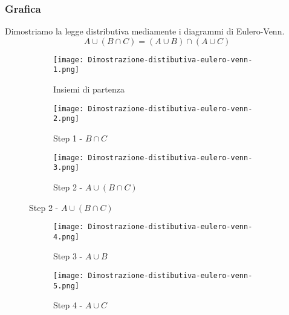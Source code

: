 \subsubsection{Grafica}
\begin{example}
    Dimostriamo la legge distributiva mediamente i diagrammi di Eulero-Venn.
    \begin{equation}
    	A \cup (B \cap C) = (A \cup B) \cap (A \cup C)
    \end{equation}
    \begin{figure}[h!]
        \begin{subfigure}{.3\textwidth}
            \texttt{[image: Dimostrazione-distibutiva-eulero-venn-1.png]}
            \caption{Insiemi di partenza}
            \label{fig:Dimostrazione-distibutiva-eulero-venn-1}
        \end{subfigure}
        \hfill
        \begin{subfigure}{.3\textwidth}
            \texttt{[image: Dimostrazione-distibutiva-eulero-venn-2.png]}
            \caption{Step 1 - $B \cap C$}
            \label{fig:Dimostrazione-distibutiva-eulero-venn-2}
        \end{subfigure}
        \hfill
        \begin{subfigure}{.3\textwidth}
            \texttt{[image: Dimostrazione-distibutiva-eulero-venn-3.png]}
            \caption{Step 2 - $A \cup (B \cap C)$}
            \label{fig:Dimostrazione-distibutiva-eulero-venn-3}
        \end{subfigure}
    \end{figure}
    \begin{figure}[h!]
        \begin{subfigure}{.3\textwidth}
            \texttt{[image: Dimostrazione-distibutiva-eulero-venn-4.png]}
            \caption{Step 3 - $A \cup B$}
            \label{fig:Dimostrazione-distibutiva-eulero-venn-4}
        \end{subfigure}
        \hfill
        \begin{subfigure}{.3\textwidth}
            \texttt{[image: Dimostrazione-distibutiva-eulero-venn-5.png]}
            \caption{Step 4 - $A \cup C$}
            \label{fig:Dimostrazione-distibutiva-eulero-venn-5}
        \end{subfigure}
        \hfill
        \begin{subfigure}{.3\textwidth}

\end{subfigure}
\end{figure}
\end{example}
